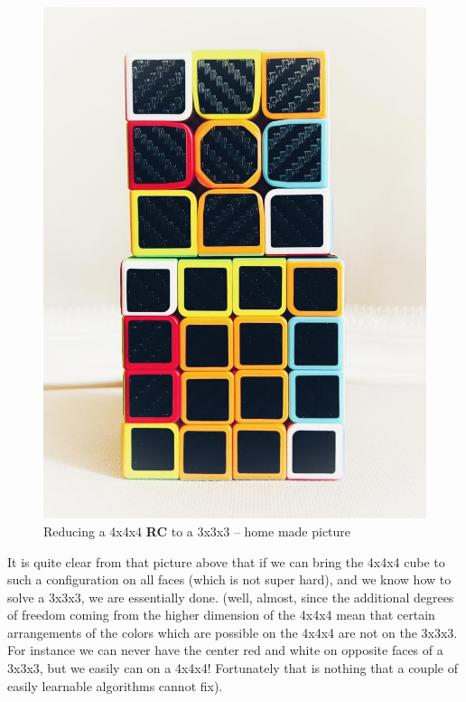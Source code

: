 \begin{figure}[H]
\centering
\includegraphics[scale=0.3]{./Figures/RC333444}
\caption[Reducing RC]{Reducing a 4x4x4 \textbf{RC} to a 3x3x3 -- home made picture}
\end{figure}


 It is quite clear from that picture above that if we can bring the 4x4x4 cube to such a configuration on all faces (which is not super hard), and we know how to solve a 3x3x3, we are essentially done. (well, almost, since the additional degrees of freedom coming from the higher dimension of the 4x4x4 mean that certain arrangements of the colors which are possible on the 4x4x4 are not on the 3x3x3. For instance we can never have the center red and white on opposite faces of a 3x3x3, but we easily can on a 4x4x4! Fortunately that is nothing that a couple of easily learnable algorithms cannot fix).




